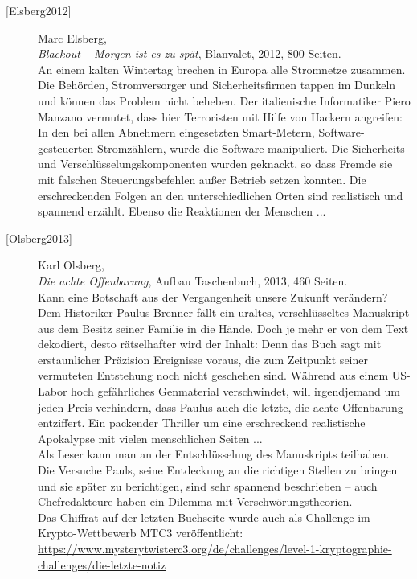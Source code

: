 \begin{refsegment}
\begin{description}
\item[\textrm{[Elsberg2012]}] 
    Marc Elsberg,\\
    {\em Blackout -- Morgen ist es zu spät}, Blanvalet, 2012, 800 Seiten.\\
    An einem kalten Wintertag brechen in Europa alle Stromnetze zusammen.
    Die Behörden, Stromversorger und Sicherheitsfirmen tappen im Dunkeln und können das
    Problem nicht beheben.
    Der italienische Informatiker Piero Manzano vermutet, dass hier Terroristen mit
    Hilfe von Hackern angreifen: In den bei
    allen Abnehmern eingesetzten Smart-Metern, Software-gesteuerten Stromzählern, wurde
    die Software manipuliert. Die Sicherheits- und Verschlüsselungskomponenten wurden
    geknackt, so dass Fremde sie mit falschen Steuerungsbefehlen außer Betrieb setzen
    konnten. Die erschreckenden Folgen an den unterschiedlichen Orten sind realistisch
    und spannend erzählt. Ebenso die Reaktionen der Menschen ...\\



\item[\textrm{[Olsberg2013]}] 
    Karl Olsberg,\\
    {\em Die achte Offenbarung}, Aufbau Taschenbuch, 2013, 460 Seiten.\\
    Kann eine Botschaft aus der Vergangenheit unsere Zukunft verändern?
    Dem Historiker Paulus Brenner fällt ein uraltes, verschlüsseltes Manuskript aus
    dem Besitz seiner Familie in die Hände. Doch je mehr er von dem Text dekodiert,
    desto rätselhafter wird der Inhalt: Denn das Buch sagt mit erstaunlicher Präzision
    Ereignisse voraus, die zum Zeitpunkt seiner vermuteten Entstehung noch nicht
    geschehen sind. Während aus einem US-Labor hoch gefährliches Genmaterial
    verschwindet, will irgendjemand um jeden Preis verhindern, dass Paulus auch die
    letzte, die achte Offenbarung entziffert. Ein packender Thriller um eine
    erschreckend realistische Apokalypse mit vielen menschlichen Seiten ...\\
    Als Leser kann man an der Entschlüsselung des Manuskripts teilhaben.\\
    Die Versuche Pauls, seine Entdeckung an die richtigen Stellen zu bringen und
    sie später zu berichtigen, sind sehr spannend beschrieben -- auch
    Chefredakteure haben ein Dilemma mit Verschwörungstheorien.\\
    Das Chiffrat auf der letzten Buchseite wurde auch als Challenge im Krypto-Wettbewerb MTC3
    veröffentlicht:~~
    \url{https://www.mysterytwisterc3.org/de/challenges/level-1-kryptographie-challenges/die-letzte-notiz}\\


\end{description}
\end{refsegment}
